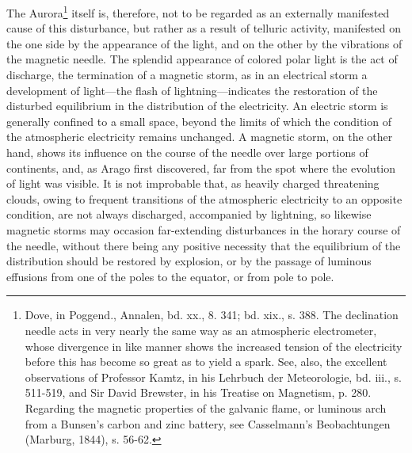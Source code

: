 The Aurora\footnote{Dove, in Poggend., Annalen, bd. xx., 8. 341; bd. xix., s. 388. The declination needle acts in very nearly the same way as an atmospheric electrometer, whose divergence in like manner shows the increased tension of the electricity before this has become so great as to yield a spark. See, also, the excellent observations of Professor Kamtz, in his Lehrbuch der Meteorologie, bd. iii., s. 511-519, and Sir David Brewster, in his Treatise on Magnetism, p. 280. Regarding the magnetic properties of the galvanic flame, or luminous arch from a Bunsen's carbon and zinc battery, see Casselmann's Beobachtungen (Marburg, 1844), s. 56-62.} itself is, therefore, not to be regarded as an externally manifested cause of this disturbance, but rather as a result of telluric activity, manifested on the one side by the appearance of the light, and on the other by the vibrations of the magnetic needle. The splendid appearance of colored polar light is the act of discharge, the termination of a magnetic storm, as in an electrical storm a development of light—the flash of lightning—indicates the restoration of the disturbed equilibrium in the distribution of the electricity. An electric storm is generally confined to a small space, beyond the limits of which the condition of the atmospheric electricity remains unchanged. A magnetic storm, on the other hand, shows its influence on the course of the needle over large portions of continents, and, as Arago first discovered, far from the spot where the evolution of light was visible. It is not improbable that, as heavily charged threatening clouds, owing to frequent transitions of the atmospheric electricity to an opposite condition, are not always discharged, accompanied by lightning, so likewise magnetic storms may occasion far-extending disturbances in the horary course of the needle, without there being any positive necessity that the equilibrium of the distribution should be restored by explosion, or by the passage of luminous effusions from one of the poles to the equator, or from pole to pole.

